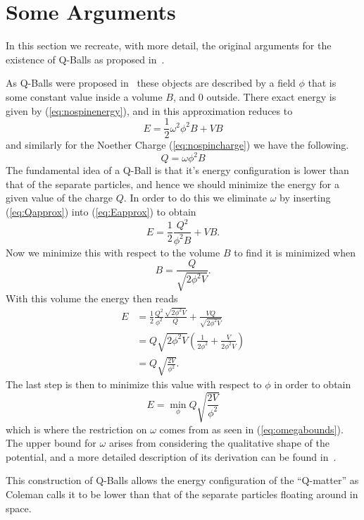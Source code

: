 \section{Some Arguments}\label{sec:appargs}
In this section we recreate, with more detail, the original arguments for the
existence of Q-Balls as proposed in~\cite{coleman}.

As Q-Balls were proposed in~\cite{coleman} these objects are described by a
field \(\phi\) that is some constant value inside a volume \(B\), and 0 outside.
There exact energy is given by (\ref{eq:nospinenergy}), and in this
approximation reduces to
\begin{equation}\label{eq:Eapprox}
    E = \frac{1}{2}\omega^2\phi^2B + VB
\end{equation}
and similarly for the Noether Charge (\ref{eq:nospincharge}) we have the following.
\begin{equation}\label{eq:Qapprox}
    Q = \omega \phi^2 B
\end{equation}
The fundamental idea of a Q-Ball is that it's energy configuration is lower than
that of the separate particles, and hence we should minimize the energy for a
given value of the charge \(Q\). In order to do this we eliminate \(\omega\) by
inserting (\ref{eq:Qapprox}) into (\ref{eq:Eapprox}) to obtain
\begin{equation}
    E = \frac{1}{2}\frac{Q^2}{\phi^2 B} + VB.
\end{equation}
Now we minimize this with respect to the volume \(B\) to find it is minimized when
\begin{equation}
    B = \frac{Q}{\sqrt{2\phi^2 V}}.
\end{equation}
With this volume the energy then reads
\begin{align}
    E & = \frac{1}{2}\frac{Q^2}{\phi^2}\frac{\sqrt{2\phi^2 V}}{Q} + \frac{VQ}{\sqrt{2\phi^2 V}} \\
      & = Q\sqrt{2\phi^2 V}\left( \frac{1}{2\phi^2} + \frac{V}{2\phi^2 V}\right)                \\
      & = Q \sqrt{\frac{2V}{\phi^2}}.
\end{align}
The last step is then to minimize this value with respect to \(\phi\) in order
to obtain
\begin{equation}
    E = \min_\phi Q \sqrt{\frac{2V}{\phi^2}}
\end{equation}
which is where the restriction on \(\omega\) comes from as seen in
(\ref{eq:omegabounds}). The upper bound for \(\omega\) arises from considering
the qualitative shape of the potential, and a more detailed description of its
derivation can be found in~\cite{coleman, qball6}.

This construction of Q-Balls allows the energy configuration of the ``Q-matter''
as Coleman calls it to be lower than that of the separate particles floating
around in space.